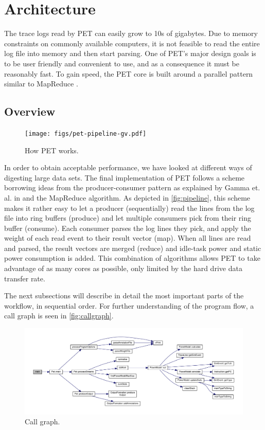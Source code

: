 \section{Architecture}

The trace logs read by PET can easily grow to 10s of gigabytes. Due to memory
constraints on commonly available computers, it is not feasible to read the
entire log file into memory and then start parsing. One of PET's major design
goals is to be user friendly and convenient to use, and as a consequence it must
be reasonably fast. To gain speed, the PET core is built around a parallel
pattern similar to MapReduce \cite{dean2008mapreduce}.


\subsection{Overview}

\begin{figure}[ht]
    \texttt{[image: figs/pet-pipeline-gv.pdf]}
    \caption{How PET works.}
    \label{fig:pipeline}
\end{figure}

In order to obtain acceptable performance, we have looked at different ways of
digesting large data sets. The final implementation of PET follows a scheme
borrowing ideas from the producer-consumer pattern as explained by Gamma et. al.
in \cite{designpatterns} and the MapReduce algorithm. As depicted in
\autoref{fig:pipeline}, this scheme makes it rather easy to let a producer
(sequentially) read the lines from the log file into ring buffers (produce) and
let multiple consumers pick from their ring buffer (consume). Each consumer
parses the log lines they pick, and apply the weight of each read event to their
result vector (map). When all lines are read and parsed, the result vectors are
merged (reduce) and idle-task power and static power consumption is added. This
combination of algorithms allows PET to take advantage of as many cores as
possible, only limited by the hard drive data transfer rate.

The next subsections will describe in detail the most important parts of the
workflow, in sequential order. For further understanding of the program flow, a
call graph is seen in \autoref{fig:callgraph}.

\begin{figure}
    \includegraphics[width=\textwidth]{figs/maincallgraph.pdf}
    \caption{Call graph.}
    \label{fig:callgraph}
\end{figure}


